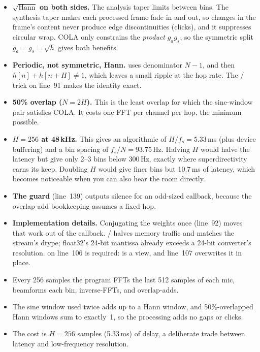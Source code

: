 \documentclass[11pt]{article}
\begin{document}
\begin{rationale}
\begin{itemize}
\item \textbf{$\sqrt{\text{Hann}}$ on both sides.} The analysis taper limits
   between bins. The synthesis taper makes each processed frame fade in and out, so changes in
  the frame's content never produce edge discontinuities (clicks), and it suppresses circular
  wrap. COLA only constrains the \emph{product} $g_a g_s$, so the symmetric split $g_a=g_s=\sqrt h$
  gives both benefits.
\item \textbf{Periodic, not symmetric, Hann.}  uses denominator $N-1$, and
  then $h[n]+h[n+H]\neq1$, which leaves a small ripple at the hop rate. The /\code{[:-1]}
  trick on line~91 makes the identity exact.
\item \textbf{50\% overlap ($N=2H$).} This is the least overlap for which the sine-window pair
  satisfies COLA. It costs one FFT per channel per hop, the minimum possible.
\item \textbf{$H=256$ at 48\,kHz.} This gives an algorithmic  of $H/f_s=5.33$\,ms (plus
  device buffering) and a bin spacing of $f_s/N=93.75$\,Hz. Halving $H$ would halve the latency
  but give only 2--3 bins below 300\,Hz, exactly where superdirectivity earns its keep. Doubling
  $H$ would give finer bins but 10.7\,ms of latency, which becomes noticeable when you can also
  hear the room directly.
\item \textbf{The  guard} (line~139) outputs silence for an odd-sized
  callback, because the overlap-add bookkeeping assumes a fixed hop.
\item \textbf{Implementation details.} Conjugating the weights once (line~92) moves that work out
  of the callback. / halves memory traffic and matches the stream's
  dtype; float32's 24-bit mantissa already exceeds a 24-bit converter's resolution.
   on line~106 is required:  is a view, and line~107 overwrites
  it in place.
\end{itemize}
\end{rationale}

\begin{takeaways}
\begin{itemize}[nosep]
\item Every 256 samples the program FFTs the last 512 samples of each mic, beamforms each bin,
  inverse-FFTs, and overlap-adds.
\item The sine window used twice adds up to a Hann window, and 50\%-overlapped Hann windows sum to
  exactly~1, so the processing adds no gaps or clicks.
\item The cost is $H=256$ samples (5.33\,ms) of delay, a deliberate trade between latency and
  low-frequency resolution.
\end{itemize}
\end{takeaways}
\end{document}
